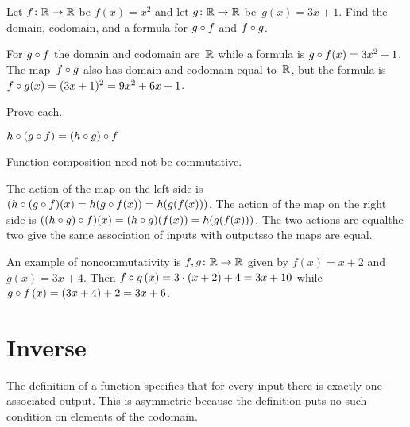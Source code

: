 \documentclass{ibl}  %
\begin{document}
\begin{problem}[\midlength]
Let $\mbox{$f\colon \mathbb{R}\to \mathbb{R}$}$ be $f(x)=x^2$ and let $\mbox{$g\colon \mathbb{R}\to \mathbb{R}$}$ be~$g(x)=3x+1$.
Find the domain, codomain, and a formula for
$g\mathbin{\circ} f$ and $f\mathbin{\circ} g$.  
\begin{answer}
For $g\mathbin{\circ} f$ the domain and codomain are~$\mathbb{R}$ while a formula is
$g\mathbin{\circ} f(x)=3x^2+1$.
The map~$f\mathbin{\circ} g$ also has domain and codomain equal to~$\mathbb{R}$,
but the formula is~$f\mathbin{\circ} g(x)=(3x+1)^2=9x^2+6x+1$.
\end{answer}
\end{problem}

\begin{problem} Prove each.
\begin{items}
\item
  $h\mathbin{\circ} (g\mathbin{\circ} f)=(h\mathbin{\circ} g)\mathbin{\circ} f$    
\item
  Function composition need not be commutative.
\end{items}
\begin{answer}
\begin{items}
\item
  The action of the map on the left side
  is $(h\mathbin{\circ} (g\mathbin{\circ} f)(x)=h(g\mathbin{\circ} f(x))
       =h(g(f(x)))$.
  The action of the map on the right side  
  is $((h\mathbin{\circ} g)\mathbin{\circ} f)(x)=(h\mathbin{\circ} g)(f(x))
      =h(g(f(x)))$.
  The two actions are equal\Dash the two give the same association of inputs
  with outputs\Dash so the maps are equal.  
\item
  An example of noncommutativity is $\mbox{$f,g\colon \mathbb{R}\to \mathbb{R}$}$ given by 
  $f(x)=x+2$ and $g(x)=3x+4$.
  Then $f\mathbin{\circ} g\,(x)=3\cdot(x+2)+4=3x+10$ while
  $g\mathbin{\circ} f\,(x)=(3x+4)+2=3x+6$.
\end{items}
\end{answer}
\end{problem}





\section{Inverse}

The definition of a function specifies that for every input 
there is exactly one associated output.
This is asymmetric because the 
definition puts no such condition on elements of the codomain.
\end{document}
